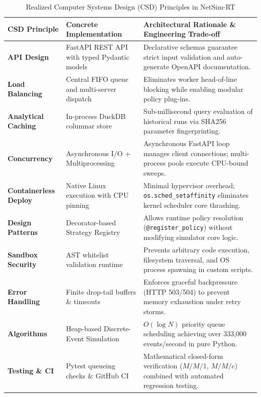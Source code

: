 \begin{table}[t]
\centering
\small
\caption{Realized Computer Systems Design (CSD) Principles in NetSim-RT}
\label{tab:csd_themes}
\begin{tabularx}{\textwidth}{l p{4.2cm} X}
\toprule
\textbf{CSD Principle} & \textbf{Concrete Implementation} & \textbf{Architectural Rationale \& Engineering Trade-off} \\
\midrule
\textbf{API Design} & FastAPI REST API with typed Pydantic models & Declarative schemas guarantee strict input validation and auto-generate OpenAPI documentation. \\
\addlinespace[2pt]
\textbf{Load Balancing} & Central FIFO queue and multi-server dispatch & Eliminates worker head-of-line blocking while enabling modular policy plug-ins. \\
\addlinespace[2pt]
\textbf{Analytical Caching} & In-process DuckDB columnar store & Sub-millisecond query evaluation of historical runs via SHA256 parameter fingerprinting. \\
\addlinespace[2pt]
\textbf{Concurrency} & Asynchronous I/O + Multiprocessing & Asynchronous FastAPI loop manages client connections; multi-process pools execute CPU-bound sweeps. \\
\addlinespace[2pt]
\textbf{Containerless Deploy} & Native Linux execution with CPU pinning & Minimal hypervisor overhead; \texttt{os.sched\_setaffinity} eliminates kernel scheduler core thrashing. \\
\addlinespace[2pt]
\textbf{Design Patterns} & Decorator-based Strategy Registry & Allows runtime policy resolution (\texttt{@register\_policy}) without modifying simulator core logic. \\
\addlinespace[2pt]
\textbf{Sandbox Security} & AST whitelist validation runtime & Prevents arbitrary code execution, filesystem traversal, and OS process spawning in custom scripts. \\
\addlinespace[2pt]
\textbf{Error Handling} & Finite drop-tail buffers \& timeouts & Enforces graceful backpressure (HTTP 503/504) to prevent memory exhaustion under retry storms. \\
\addlinespace[2pt]
\textbf{Algorithms} & Heap-based Discrete-Event Simulation & $O(\log N)$ priority queue scheduling achieving over 333,000 events/second in pure Python. \\
\addlinespace[2pt]
\textbf{Testing \& CI} & Pytest queueing checks \& GitHub CI & Mathematical closed-form verification ($M/M/1$, $M/M/c$) combined with automated regression testing. \\
\bottomrule
\end{tabularx}
\end{table}
